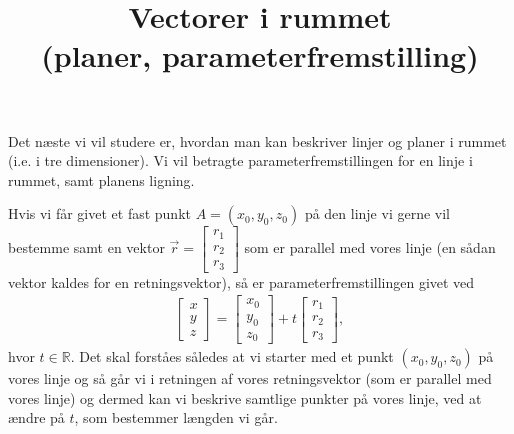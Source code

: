 \title{\Huge \textbf{Vectorer i rummet \\ (planer, parameterfremstilling)}\vspace{-1.5cm}}
\date{}
\author{}
\maketitle
\noindent Det næste vi vil studere er, hvordan man kan beskriver linjer og planer i rummet (i.e. i tre dimensioner). Vi vil betragte parameterfremstillingen for en linje i rummet, samt planens ligning.

Hvis vi får givet et fast punkt $A=(x_0,y_0,z_0)$ på den linje vi gerne vil bestemme samt en vektor $\vec{r}=\begin{bmatrix}r_1\\r_2\\r_3 \end{bmatrix}$ som er parallel med vores linje (en sådan vektor kaldes for en retningsvektor), så er parameterfremstillingen givet ved
\begin{align}\label{eq:vec3d2et}
\begin{bmatrix}x \\ y \\ z\end{bmatrix} = \begin{bmatrix}x_0 \\y_0 \\ z_0\end{bmatrix}  +t
\begin{bmatrix}r_1 \\r_2 \\ r_3 \end{bmatrix},
\end{align}
hvor $t \in \mathbb{R}$. Det skal forståes således at vi starter med et punkt $(x_0,y_0,z_0)$ på vores linje og så går vi i retningen af vores retningsvektor (som er parallel med vores linje) og dermed kan vi beskrive samtlige punkter på vores linje, ved at ændre på $t$, som bestemmer længden vi går.

